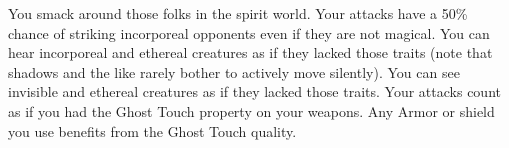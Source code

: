 \combatfeat
{You smack around those folks in the spirit world.}
{Your attacks have a 50\% chance of striking incorporeal opponents even if they are not magical.}
{You can hear incorporeal and ethereal creatures as if they lacked those traits (note that shadows and the like rarely bother to actively move silently).}
{You can see invisible and ethereal creatures as if they lacked those traits.}
{Your attacks count as if you had the Ghost Touch property on your weapons.}
{Any Armor or shield you use benefits from the Ghost Touch quality.}